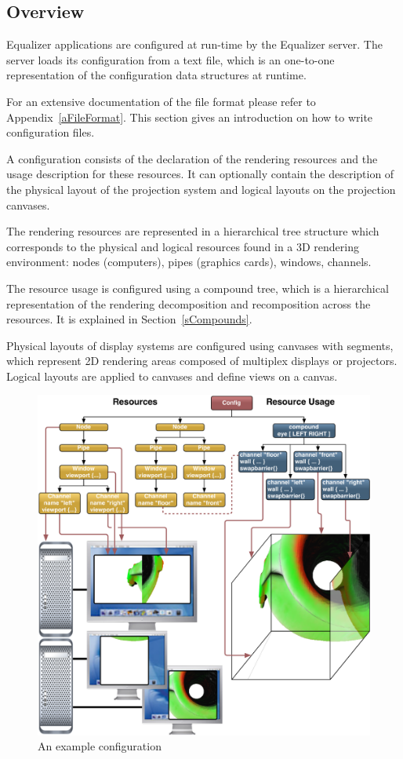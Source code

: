 \documentclass[10pt,a4]{scrartcl}
\newcommand{\sref}[1]{Section~\ref{#1}}
\newcommand{\aref}[1]{Appendix~\ref{#1}}
\begin{document}
\subsection{Overview}

Equalizer applications are configured at run-time by the Equalizer
server. The server loads its configuration from a text file, which is an
one-to-one representation of the configuration data structures at
runtime.

For an extensive documentation of the file format please refer to
\aref{aFileFormat}. This section gives an introduction on how to write
configuration files.

A configuration consists of the declaration of the rendering resources
and the usage description for these resources. It can optionally contain
the description of the physical layout of the projection system and
logical layouts on the projection canvases.

The rendering resources are represented in a hierarchical tree structure
which corresponds to the physical and logical resources found in a 3D
rendering environment: nodes (computers), pipes (graphics cards),
windows, channels. 

The resource usage is configured using a compound tree, which is a
hierarchical representation of the rendering decomposition and
recomposition across the resources. It is explained in \sref{sCompounds}.

Physical layouts of display systems are configured using canvases with
segments, which represent 2D rendering areas composed of multiplex
displays or projectors. Logical layouts are applied to canvases and
define views on a canvas.

\begin{figure}[ht!]\center
  \includegraphics[width=\textwidth]{images/cave.pdf}
  {\caption{\label{fConfig}An example configuration}}
\end{figure}
\end{document}
